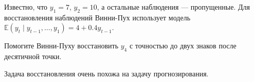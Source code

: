 
\begin{question}
Известно, что \(y_1 = 7\), \(y_{2} = 10\), а остальные наблюдения --- пропущенные.
Для восстановления наблюдений Винни-Пух использует модель \(\mathbb{E}(y_t \mid y_{t-1}, \ldots, y_1) = 4 + 0.4 y_{t-1}\).

Помогите Винни-Пуху восстановить \(y_{4}\) с точностью до двух знаков после десятичной точки.
\end{question}

\begin{solution}
Задача восстановления очень похожа на задачу прогнозирования.
\end{solution}

